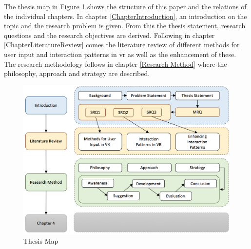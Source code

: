 The thesis map in Figure \ref{fig:thesismap} shows the structure of this paper and the relations of the individual chapters. \newline
In chapter \ref{ChapterIntroduction}, an introduction on the topic and the research problem is given. From this the thesis statement, research questions and the research objectives are derived. Following in chapter \ref{ChapterLiteratureReview} comes the literature review of different methods for user input and interaction patterns in \gls{vr} as well as the enhancement of these.
The research methodology follows in chapter \ref{Research Method} where the philosophy, approach and strategy are described. \newline
\begin{figure}[pt]
	\begin{center}
		\includegraphics[width=14cm]{03_Figures/06_Introduction/ThesisMap.png}
		\caption{Thesis Map}
		\label{fig:thesismap}
	\end{center}
\end{figure}






